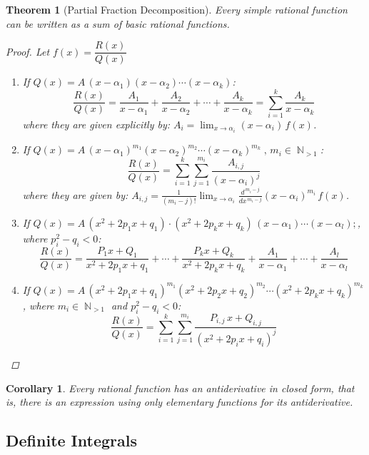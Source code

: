 \documentclass[12pt]{article}
\DeclareMathOperator{\N}{\mathbb{N}}
\newtheorem{theorem}{Theorem}[subsection]
\newtheorem{corollary}{Corollary}[subsection]
\begin{document}
\begin{theorem}[Partial Fraction Decomposition]
  Every simple rational function can be written as a sum of basic rational functions.
  \begin{proof}
    Let $f(x)=\dfrac{R(x)}{Q(x)}\,$
    \begin{enumerate}
      \item If $Q(x)=A\,(x-\alpha_1)(x-\alpha_2)\cdots(x-\alpha_k)$: $$\frac{R(x)}{Q(x)}=\frac{A_1}{x-\alpha_1}+\frac{A_2}{x-\alpha_2}+\cdots+\frac{A_k}{x-\alpha_k}=\sum_{i=1}^k\frac{A_k}{x-\alpha_k}$$ where they are given explicitly by: $\displaystyle A_i=\lim_{x\to\alpha_i}(x-\alpha_i)\,f(x)$. 
      \item If $Q(x)=A\,(x-\alpha_1)^{m_1}(x-\alpha_2)^{m_2}\cdots(x-\alpha_k)^{m_k}\;,\,m_i\in\N_{>1}$: $$\frac{R(x)}{Q(x)}=\sum_{i=1}^k\sum_{j=1}^{m_i}\frac{A_{i,j}}{(x-\alpha_i)^j}$$ where they are given by: $\displaystyle A_{i,j}=\frac{1}{(m_i-j)!}\lim_{x\to\alpha_i}\frac{d^{\,m_i-j}}{dx^{\,m_i-j}}(x-\alpha_i)^{m_i}\,f(x)$.
      \item If $Q(x)=A\,(x^2+2p_1 x+q_1)\cdot(x^2+2p_k x+q_k)\,(x-\alpha_1)\cdots(x-\alpha_l);$, where $p_i^2-q_i<0$: $$ \frac{R(x)}{Q(x)}=\frac{P_1x+Q_1}{x^2+2p_1x+q_1}+\cdots+\frac{P_kx+Q_k}{x^2+2p_kx+q_k}+\frac{A_1}{x-\alpha_1}+\cdots+\frac{A_l}{x-\alpha_l}$$
      \item If $Q(x)=A\,(x^2+2p_1 x+q_1)^{m_1}(x^2+2p_2 x+q_2)^{m_2}\cdots(x^2+2p_k x+q_k)^{m_k}$, where $m_i\in\N_{>1}$ and $p_i^2-q_i<0$: $$\frac{R(x)}{Q(x)}=\sum_{i=1}^k\sum_{j=1}^{m_i}\frac{P_{i,j}\,x+Q_{i,j}}{(x^2+2p_i x+q_i)^j}$$
    \end{enumerate}
  \end{proof}
\end{theorem}

\begin{corollary}
  Every rational function has an antiderivative in closed form, that is, there is an expression using only elementary functions for its antiderivative.
\end{corollary}

\pagebreak

\subsection{Definite Integrals}
\end{document}
